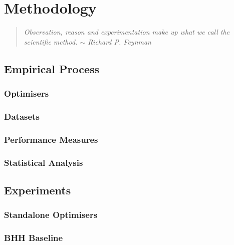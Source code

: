 \chapter{Methodology}
\label{chap:methodology}

\begin{quote}
    \textit{Observation, reason and experimentation make up what we call the scientific method. $\sim$ Richard P. Feynman}
\end{quote}

\section{Empirical Process}
\label{sec:empirical_process}

\subsection{Optimisers}
\label{sec:empirical_process:optimisers}

\subsection{Datasets}
\label{sec:empirical_process:datasets}

\subsection{Performance Measures}
\label{sec:empirical_process:performance_measures}

\subsection{Statistical Analysis}
\label{sec:empirical_process:statistical_analysis}

\section{Experiments}
\label{sec:experiments}

\subsection{Standalone Optimisers}
\label{sec:experiments:standalone_optimisers}

\subsection{BHH Baseline}
\label{sec:experiments:bhh_baseline}

